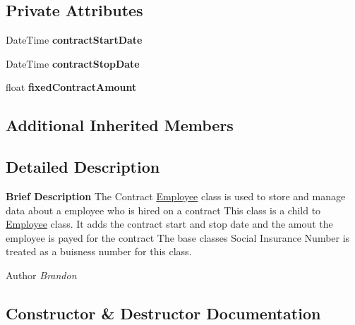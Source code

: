 \subsection*{Private Attributes}
\begin{DoxyCompactItemize}
\item 
\hypertarget{class_all_employees_1_1_contract_employee_aeef462cc8bd0639b674bba0632b6586b}{}Date\+Time {\bfseries contract\+Start\+Date}\label{class_all_employees_1_1_contract_employee_aeef462cc8bd0639b674bba0632b6586b}

\item 
\hypertarget{class_all_employees_1_1_contract_employee_ab549d2c8addad182fd66246c41ca73b7}{}Date\+Time {\bfseries contract\+Stop\+Date}\label{class_all_employees_1_1_contract_employee_ab549d2c8addad182fd66246c41ca73b7}

\item 
\hypertarget{class_all_employees_1_1_contract_employee_a81526f8517894ce466b70e3ffa61a8a8}{}float {\bfseries fixed\+Contract\+Amount}\label{class_all_employees_1_1_contract_employee_a81526f8517894ce466b70e3ffa61a8a8}

\end{DoxyCompactItemize}
\subsection*{Additional Inherited Members}


\subsection{Detailed Description}
{\bfseries Brief Description} The Contract \hyperlink{class_all_employees_1_1_employee}{Employee} class is used to store and manage data about a employee who is hired on a contract This class is a child to \hyperlink{class_all_employees_1_1_employee}{Employee} class. It adds the contract start and stop date and the amout the employee is payed for the contract The base classes Social Insurance Number is treated as a buisness number for this class. 

\begin{DoxyAuthor}{Author}
{\itshape Brandon} 
\end{DoxyAuthor}


\subsection{Constructor \& Destructor Documentation}
\hypertarget{class_all_employees_1_1_contract_employee_afb78892e913ff2a34aed4d7b78d6c9f7}{}
